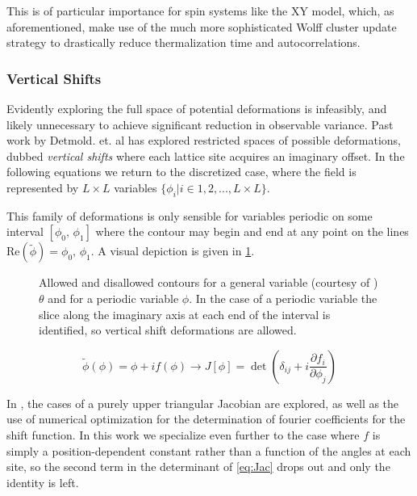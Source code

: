 \documentclass[12pt]{article}
\begin{document}
This is of particular importance for spin systems like the XY model, which, as aforementioned, make use of the much more sophisticated Wolff 
cluster update strategy to drastically reduce thermalization time and autocorrelations.

\subsubsection{Vertical Shifts}

Evidently exploring the full space of potential deformations is infeasibly, and likely unnecessary to achieve significant reduction in observable
variance. Past work by Detmold. et. al \cite{Detmold_2021} has explored restricted spaces of possible deformations, dubbed \textit{vertical shifts} where 
each lattice site acquires an imaginary offset. In the following equations we return to the discretized case, where the field is represented
by $L\times L$ variables $\{\phi_i | i\in{1,2,...,L\times L}\}$.

This family of deformations is only sensible for variables periodic on some interval $[\phi_0,\,\phi_1]$ where the contour may begin and end at any point on the 
lines $\mathrm{Re}(\tilde{\phi}) = \phi_0,\,\phi_1$. A visual depiction is given in \ref{fig:contours}.

\begin{figure}
	\begin{center}
	
	\end{center}
	\caption[Vertical Shift Illustration]{Allowed and disallowed contours for a general variable (courtesy of \cite{Detmold_2021}) $\theta$ and for a periodic variable $\phi$.
	In the case of a periodic variable the slice along the imaginary axis at each end of the interval is identified, 
	so vertical shift deformations are allowed.}
	\label{fig:contours}
\end{figure}

\begin{equation} \label{eq:Jac}
	\tilde{\phi}(\phi) = \phi + if(\phi) \rightarrow J[\phi] = \det\left(\delta_{ij} + i \frac{\partial f_i}{\partial \phi_j} \right)
\end{equation}

In \cite{Detmold_2021}, the cases of a purely upper triangular Jacobian are explored, as well as the use of numerical optimization for the determination of fourier coefficients
for the shift function. In this work we specialize even further to the case where $f$ is simply a position-dependent constant rather than a function of the angles
at each site, so the second term in the determinant of \ref{eq:Jac} drops out and only the identity is left. 
\end{document}
